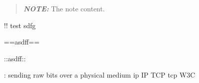 \begin{quote}
\textbf{\emph{NOTE:}} The note content.
\end{quote}

!! test sdfg

==asdff==

::asdff::

\begin{Shaded}
\begin{Highlighting}[]
\end{Highlighting}
\end{Shaded}

: sending raw bits over a physical medium ip IP TCP tcp W3C
